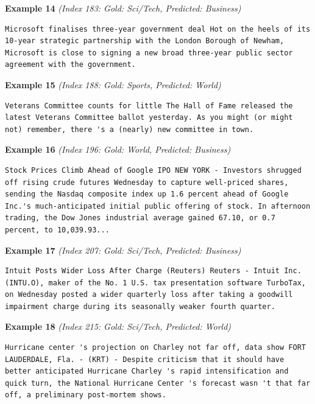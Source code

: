 \noindent
\textbf{Example 14} \quad \textit{(Index 183: Gold: Sci/Tech, Predicted: Business)}

\begin{Verbatim}[breaklines=true,breakanywhere=true,fontsize=\small]
Microsoft finalises three-year government deal Hot on the heels of its 10-year strategic partnership with the London Borough of Newham, Microsoft is close to signing a new broad three-year public sector agreement with the government.
\end{Verbatim}

\noindent
\textbf{Example 15} \quad \textit{(Index 188: Gold: Sports, Predicted: World)}

\begin{Verbatim}[breaklines=true,breakanywhere=true,fontsize=\small]
Veterans Committee counts for little The Hall of Fame released the latest Veterans Committee ballot yesterday. As you might (or might not) remember, there 's a (nearly) new committee in town.
\end{Verbatim}

\noindent
\textbf{Example 16} \quad \textit{(Index 196: Gold: World, Predicted: Business)}

\begin{Verbatim}[breaklines=true,breakanywhere=true,fontsize=\small]
Stock Prices Climb Ahead of Google IPO NEW YORK - Investors shrugged off rising crude futures Wednesday to capture well-priced shares, sending the Nasdaq composite index up 1.6 percent ahead of Google Inc.'s much-anticipated initial public offering of stock. In afternoon trading, the Dow Jones industrial average gained 67.10, or 0.7 percent, to 10,039.93...
\end{Verbatim}

\noindent
\textbf{Example 17} \quad \textit{(Index 207: Gold: Sci/Tech, Predicted: Business)}

\begin{Verbatim}[breaklines=true,breakanywhere=true,fontsize=\small]
Intuit Posts Wider Loss After Charge (Reuters) Reuters - Intuit Inc. (INTU.O), maker of the No. 1 U.S. tax presentation software TurboTax, on Wednesday posted a wider quarterly loss after taking a goodwill impairment charge during its seasonally weaker fourth quarter.
\end{Verbatim}

\noindent
\textbf{Example 18} \quad \textit{(Index 215: Gold: Sci/Tech, Predicted: World)}

\begin{Verbatim}[breaklines=true,breakanywhere=true,fontsize=\small]
Hurricane center 's projection on Charley not far off, data show FORT LAUDERDALE, Fla. - (KRT) - Despite criticism that it should have better anticipated Hurricane Charley 's rapid intensification and quick turn, the National Hurricane Center 's forecast wasn 't that far off, a preliminary post-mortem shows.
\end{Verbatim}

